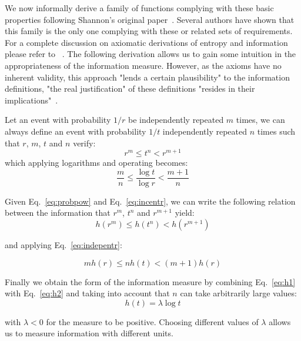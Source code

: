 We now informally derive a family of functions complying with these basic properties following Shannon's original paper~\cite{Shannon_48}. Several authors have shown that this family is the only one complying with these or related sets of requirements. For a complete discussion on axiomatic derivations of entropy and information please refer to~ \cite{Aczel_74,Aczel_75,Csiszar_08,Feinstein_58}. The following derivation allows us to gain some intuition in the appropriateness of the information measure. However, as the axioms have no inherent validity, this approach "lends a certain plausibility" to the information definitions, "the real justification" of these definitions "resides in their implications"~\cite{Shannon_48}.

Let an event with probability $1/r$ be independently repeated $m$ times, we can always define an event with probability $1/t$ independently repeated $n$ times such that $r$, $m$, $t$ and $n$ verify:
         \begin{equation}
         \label{eq:probpow}
         r^m \le t^n < r^{m+1}
         \end{equation}
\noindent which applying logarithms and operating becomes:
         \begin{equation}
         \label{eq:h1}
         \frac{m}{n} \le \frac{\log t}{\log r} < \frac{m+1}{n}
         \end{equation}

Given Eq.~\ref{eq:probpow} and Eq.~\ref{eq:incentr}, we can write the following relation between the information that $r^m$, $t^n$ and $r^{m+1}$ yield: 
\begin{equation}
         h(r^m) \leq h(t^n) < h(r^{m+1})
\end{equation}

\noindent and applying Eq.~\ref{eq:indepentr}:

\begin{equation}
\label{eq:h2}
         mh(r) \leq nh(t) < (m+1)h(r)
\end{equation}

Finally we obtain the form of the information measure by combining Eq.~\ref{eq:h1} with Eq.~\ref{eq:h2} and taking into account that $n$ can take arbitrarily large values:
\begin{equation}
\label{eq:h}
         h(t) = \lambda \log t
\end{equation}

\noindent with $\lambda < 0$ for the measure to be positive. Choosing different values of $\lambda$ allows us to measure information with different units. 

